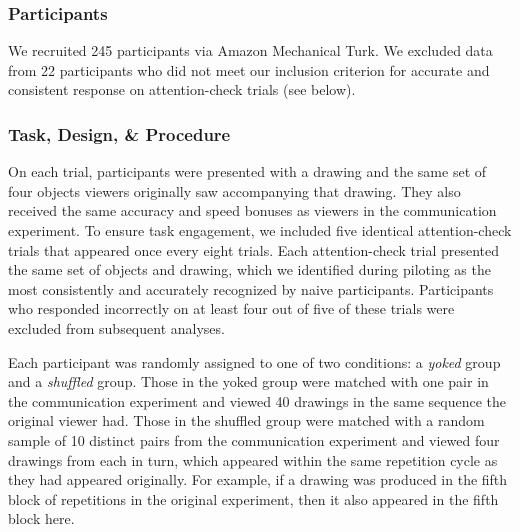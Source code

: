 \documentclass[10pt,letterpaper]{article}
\begin{document}
\subsubsection{Participants}

We recruited 245 participants via Amazon Mechanical Turk.
We excluded data from 22 participants who did not meet our inclusion criterion for accurate and consistent response on attention-check trials (see below).

\subsubsection{Task, Design, \& Procedure}

On each trial, participants were presented with a drawing and the same set of four objects viewers originally saw accompanying that drawing.
They also received the same accuracy and speed bonuses as viewers in the communication experiment.
To ensure task engagement, we included five identical attention-check trials that appeared once every eight trials.
Each attention-check trial presented the same set of objects and drawing, which we identified during piloting as the most consistently and accurately recognized by naive participants.
Participants who responded incorrectly on at least four out of five of these trials were excluded from subsequent analyses.

Each participant was randomly assigned to one of two conditions: a \textit{yoked} group and a \textit{shuffled} group.
Those in the yoked group were matched with one pair in the communication experiment and viewed 40 drawings in the same sequence the original viewer had.
Those in the shuffled group were matched with a random sample of 10 distinct pairs from the communication experiment and viewed four drawings from each in turn, which appeared within the same repetition cycle as they had appeared originally.
For example, if a drawing was produced in the fifth block of repetitions in the original experiment, then it also appeared in the fifth block here.
\end{document}
